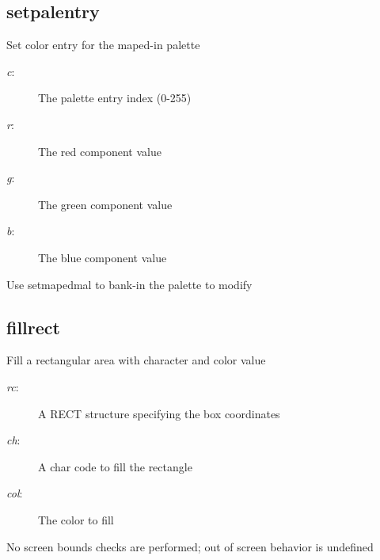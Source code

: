 \subsection{setpalentry}
\begin{description}[leftmargin=2cm,style=nextline]
\item [Description:] {Set color entry for the maped-in palette}
\item [Syntax:] 
\item [Parameters:]
\begin{description}\item[]
\item [{\em c}:] {The palette entry index (0-255)}
\item [{\em r}:] {The red component value}
\item [{\em g}:] {The green component value}
\item [{\em b}:] {The blue component value}
\end{description}
\item [Notes:] {Use setmapedmal to bank-in the palette to modify}
\end{description}

\subsection{fillrect}
\begin{description}[leftmargin=2cm,style=nextline]
\item [Description:] {Fill a rectangular area with character and color value}
\item [Syntax:] 
\item [Parameters:]
\begin{description}\item[]
\item [{\em rc}:] {A RECT structure specifying the box coordinates}
\item [{\em ch}:] {A char code to fill the rectangle}
\item [{\em col}:] {The color to fill}
\end{description}
\item [Notes:] {No screen bounds checks are performed; out of screen behavior is undefined }
\end{description}

